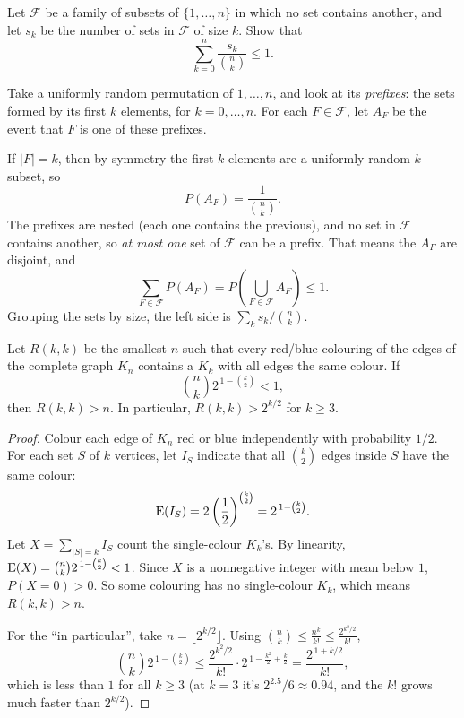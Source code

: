 \begin{example}\label{ex:lym}
Let $\mathcal{F}$ be a family of subsets of $\{1, \dots, n\}$ in which no set contains another, and let $s_k$ be the number of sets in $\mathcal{F}$ of size $k$. Show that
\medskip
\[
\sum_{k=0}^{n} \frac{s_k}{\binom{n}{k}} \le 1.
\]
\end{example}

\medskip

\begin{solution}
Take a uniformly random permutation of $1, \dots, n$, and look at its \emph{prefixes}: the sets formed by its first $k$ elements, for $k = 0, \dots, n$. For each $F \in \mathcal{F}$, let $A_F$ be the event that $F$ is one of these prefixes.

\medskip

If $|F| = k$, then by symmetry the first $k$ elements are a uniformly random $k$-subset, so
\medskip
\[
P(A_F) = \frac{1}{\binom{n}{k}}.
\]
\medskip
The prefixes are nested (each one contains the previous), and no set in $\mathcal{F}$ contains another, so \emph{at most one} set of $\mathcal{F}$ can be a prefix. That means the $A_F$ are disjoint, and
\medskip
\[
\sum_{F \in \mathcal{F}} P(A_F) = P\left(\bigcup_{F \in \mathcal{F}} A_F\right) \le 1.
\]
\medskip
Grouping the sets by size, the left side is $\sum_{k} s_k / \binom{n}{k}$.
\end{solution}

\bigskip

\begin{theorem}\label{thm:ramsey}
Let $R(k, k)$ be the smallest $n$ such that every red/blue colouring of the edges of the complete graph $K_n$ contains a $K_k$ with all edges the same colour. If
\medskip
\[
\binom{n}{k} 2^{\,1 - \binom{k}{2}} < 1,
\]
\medskip
then $R(k, k) > n$. In particular, $R(k, k) > 2^{k/2}$ for $k \ge 3$.
\end{theorem}

\medskip

\begin{proof}
Colour each edge of $K_n$ red or blue independently with probability $1/2$. For each set $S$ of $k$ vertices, let $I_S$ indicate that all $\binom{k}{2}$ edges inside $S$ have the same colour:
\medskip
\[
\operatorname{E}(I_S) = 2 \left(\frac{1}{2}\right)^{\binom{k}{2}} = 2^{\,1 - \binom{k}{2}}.
\]
\medskip
Let $X = \sum_{|S| = k} I_S$ count the single-colour $K_k$'s. By linearity, $\operatorname{E}(X) = \binom{n}{k} 2^{\,1 - \binom{k}{2}} < 1$. Since $X$ is a nonnegative integer with mean below $1$, $P(X = 0) > 0$. So some colouring has no single-colour $K_k$, which means $R(k, k) > n$.

\medskip

For the ``in particular'', take $n = \lfloor 2^{k/2} \rfloor$. Using $\binom{n}{k} \le \frac{n^{k}}{k!} \le \frac{2^{k^{2}/2}}{k!}$,
\medskip
\[
\binom{n}{k} 2^{\,1 - \binom{k}{2}} \le \frac{2^{k^{2}/2}}{k!} \cdot 2^{\,1 - \frac{k^{2}}{2} + \frac{k}{2}} = \frac{2^{\,1 + k/2}}{k!},
\]
\medskip
which is less than $1$ for all $k \ge 3$ (at $k = 3$ it's $2^{2.5}/6 \approx 0.94$, and the $k!$ grows much faster than $2^{k/2}$).
\end{proof}

